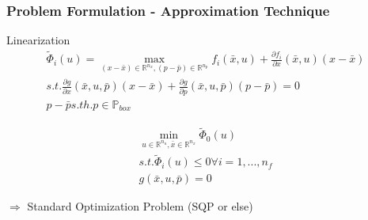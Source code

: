 \begin{frame}
	\frametitle{Problem Formulation - Approximation Technique}

\begin{block}{Linearization}
	\begin{align*}
	\tilde{\Phi}_{i}(u)=\max_{(x-\bar{x})\in\mathbb{R}^{n_{x}}, (p-\bar{p})\in\mathbb{R}^{n_{p}}} f_{i}(\bar{x}, u)+\frac{\partial f_{i}}{\partial x}(\bar{x}, u)(x-\bar{x})\\
	s.t. \frac{\partial g}{\partial x}(\bar{x}, u, \bar{p})(x-\bar{x})+\frac{\partial g}{\partial p}(\bar{x}, u, \bar{p})(p-\bar{p})=0\\
	p-\bar{p} s.th. p\in\mathbb{P}_{box}
	\end{align*}
\end{block}	
	

	
\begin{block}	

\begin{align*}
\min_{u\in\mathbb{R}^{n_{u}}, \bar{x}\in\mathbb{R}^{n_{x}}} \tilde{\Phi}_{0}(u)\\
s.t. \tilde{\Phi}_{i}(u)\leq 0 \forall i=1,...,n_{f}\\
g(\bar{x}, u, \bar{p})=0
\end{align*}
\end{block} 
	
$\Rightarrow$ Standard Optimization Problem (SQP or else)
\end{frame}